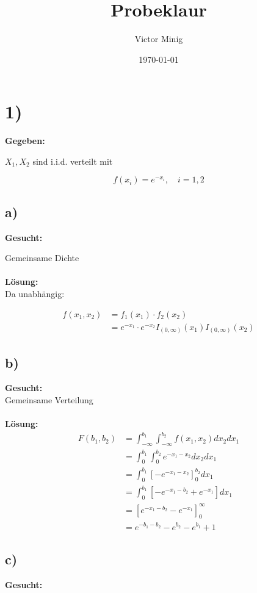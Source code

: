 \documentclass{article}
\begin{document}
\title{Probeklaur}
\author{Victor Minig}
\date{\today}
\maketitle

\section*{1)}
\textbf{Gegeben:}

$X_1, X_2$ sind i.i.d. verteilt mit 

\[f(x_i) = e^{-x_i}, \quad i = 1,2\]

\subsection*{a)}
\textbf{Gesucht:}

Gemeinsame Dichte\\\\
\textbf{Lösung:}\\

Da unabhängig:

\begin{align*}
    f(x_1, x_2) &= f_1(x_1) \cdot f_2(x_2) \\
    &= e^{-x_1} \cdot e^{-x_2} I_{(0, \infty)}(x_1)I_{(0, \infty)}(x_2)
\end{align*}
\subsection*{b)}
\textbf{Gesucht:}\\

Gemeinsame Verteilung \\\\
\textbf{Lösung:}\\

\begin{align*}
    F(b_1, b_2) &= \int_{-\infty}^{b_1} \int_{-\infty}^{b_2} f(x_1, x_2) dx_2 dx_1 \\
    &= \int_{0}^{b_1} \int_{0}^{b_2} e^{-x_1-x_2} dx_2 dx_1 \\
    &= \int_{0}^{b_1} \left[-e^{-x_1-x_2}\right]_0^{b_2} dx_1 \\
    &= \int_{0}^{b_1} \left[-e^{-x_1 -b_2} + e^{-x_1}\right] dx_1 \\
    &= \left[e^{-x_1-b_2} - e^{-x_1}\right]_0^{\infty} \\
    &= e^{-b_1-b_2} - e^{b_2} - e^{b_1} + 1 
\end{align*}
\subsection*{c)}
\textbf{Gesucht:}\\
\end{document}
